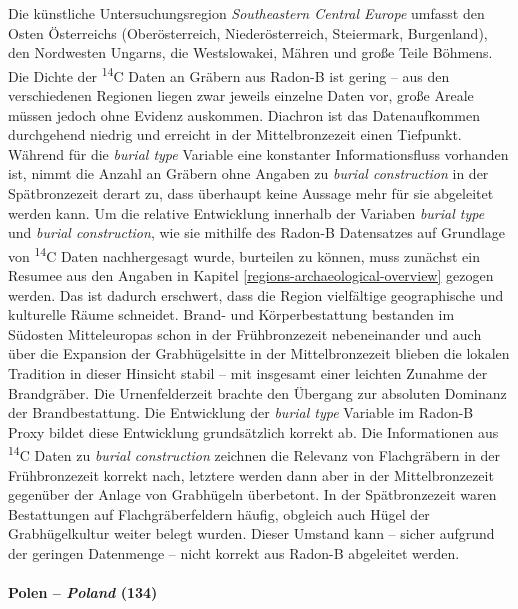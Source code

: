 \documentclass[openany,twoside,twocolumn]{book}
\begin{document}
Die künstliche Untersuchungsregion \emph{Southeastern Central Europe}
umfasst den Osten Österreichs (Oberösterreich, Niederösterreich,
Steiermark, Burgenland), den Nordwesten Ungarns, die Westslowakei,
Mähren und große Teile Böhmens. Die Dichte der \textsuperscript{14}C
Daten an Gräbern aus Radon-B ist gering -- aus den verschiedenen
Regionen liegen zwar jeweils einzelne Daten vor, große Areale müssen
jedoch ohne Evidenz auskommen. Diachron ist das Datenaufkommen
durchgehend niedrig und erreicht in der Mittelbronzezeit einen
Tiefpunkt. Während für die \emph{burial type} Variable eine konstanter
Informationsfluss vorhanden ist, nimmt die Anzahl an Gräbern ohne
Angaben zu \emph{burial construction} in der Spätbronzezeit derart zu,
dass überhaupt keine Aussage mehr für sie abgeleitet werden kann. Um die
relative Entwicklung innerhalb der Variaben \emph{burial type} und
\emph{burial construction}, wie sie mithilfe des Radon-B Datensatzes auf
Grundlage von \textsuperscript{14}C Daten nachhergesagt wurde, burteilen
zu können, muss zunächst ein Resumee aus den Angaben in Kapitel
\ref{regions-archaeological-overview} gezogen werden. Das ist dadurch
erschwert, dass die Region vielfältige geographische und kulturelle
Räume schneidet. Brand- und Körperbestattung bestanden im Südosten
Mitteleuropas schon in der Frühbronzezeit nebeneinander und auch über
die Expansion der Grabhügelsitte in der Mittelbronzezeit blieben die
lokalen Tradition in dieser Hinsicht stabil -- mit insgesamt einer
leichten Zunahme der Brandgräber. Die Urnenfelderzeit brachte den
Übergang zur absoluten Dominanz der Brandbestattung. Die Entwicklung der
\emph{burial type} Variable im Radon-B Proxy bildet diese Entwicklung
grundsätzlich korrekt ab. Die Informationen aus \textsuperscript{14}C
Daten zu \emph{burial construction} zeichnen die Relevanz von
Flachgräbern in der Frühbronzezeit korrekt nach, letztere werden dann
aber in der Mittelbronzezeit gegenüber der Anlage von Grabhügeln
überbetont. In der Spätbronzezeit waren Bestattungen auf
Flachgräberfeldern häufig, obgleich auch Hügel der Grabhügelkultur
weiter belegt wurden. Dieser Umstand kann -- sicher aufgrund der
geringen Datenmenge -- nicht korrekt aus Radon-B abgeleitet werden.

\hypertarget{polen-poland-134}{%
\paragraph{\texorpdfstring{Polen -- \emph{Poland}
(134)}{Polen -- Poland (134)}}\label{polen-poland-134}}
\end{document}
